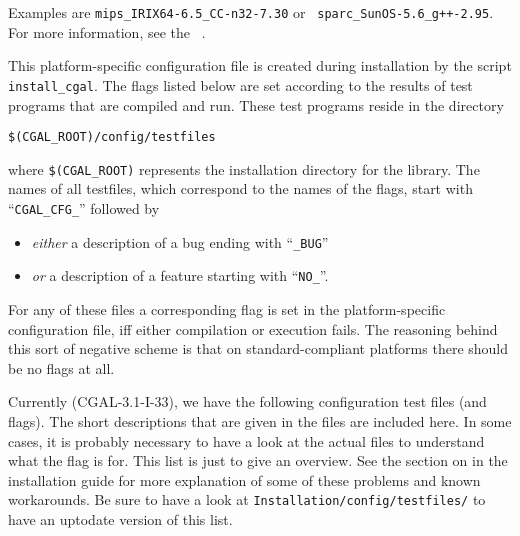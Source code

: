 \noindent Examples are \texttt{mips\_IRIX64-6.5\_CC-n32-7.30} or {\tt
  sparc\_SunOS-5.6\_g++-2.95}. For more information, see the \cgal\ 
.
\ccIndexSubitemEnd{flag}{for OS \& compiler}

This platform-specific configuration file is created during
installation by the script \texttt{install\_cgal}. The flags listed below
are set according to the results of test programs that are compiled and run.
These test programs reside in the directory
\begin{center}
\verb|$(CGAL_ROOT)/config/testfiles|
\end{center}
where \verb|$(CGAL_ROOT)| represents the installation directory for the library.
The names of all testfiles, which correspond to the names of the flags, 
\ccIndexSubitem{workaround flags}{names}
start with ``\texttt{CGAL\_CFG\_}'' followed by
\begin{itemize}
\item \textit{either} a description of a bug ending with
  ``\texttt{\_BUG}''
\item \textit{or} a description of a feature starting with
  ``\texttt{NO\_}''.
\end{itemize}
For any of these files a corresponding flag is set in the 
platform-specific configuration file, iff either compilation or execution
fails. The reasoning behind this sort of negative scheme is that on
standard-compliant platforms there should be no flags at all.


\noindent Currently (CGAL-3.1-I-33), we have the following configuration
test files (and flags). The short descriptions that are given in the files are 
included here. In some cases, it is probably necessary to have a look at the
actual files to understand what the flag is for. This list is just to
give an overview.  See the section on
 in the installation guide
for more explanation of some of these problems and known workarounds. 
Be sure to have a look at \texttt{Installation/config/testfiles/} to have an
uptodate version of this list.


